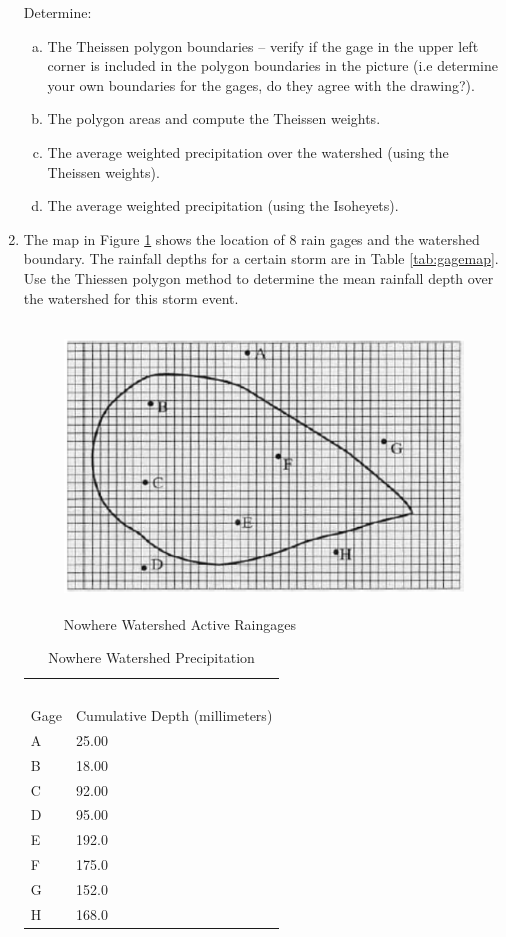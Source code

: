 \documentclass[12pt]{article}
\begin{document}
\begin{enumerate}
Determine:
    \begin{enumerate}[a)]
        \item The Theissen polygon boundaries – verify if the gage in the upper left corner is included in the polygon boundaries in the picture (i.e determine your own boundaries for the gages, do they agree with the drawing?). 
        \item The polygon areas and compute the Theissen weights.
        \item The average weighted precipitation over the watershed (using the Theissen weights).
        \item The average weighted precipitation (using the Isoheyets).
    \end{enumerate}
\clearpage
\item The map in Figure \ref{fig:gagemap} shows the location of 8 rain gages and the watershed boundary. The rainfall depths for a certain storm are in Table \ref{tab:gagemap}. Use the Thiessen polygon method to determine the mean rainfall depth over the watershed for this storm event.

\begin{figure}[h!] %
   \centering
   \includegraphics[height=3in]{gagemap.png} 
   \caption{Nowhere Watershed Active Raingages}
   \label{fig:gagemap}
\end{figure}

\begin{table}[h!]
\centering
\caption{Nowhere Watershed Precipitation}
\begin{tabular}{p{2.0in}p{2.0in}} %
~&~\\
Gage & Cumulative Depth (millimeters)\\
\hline
\hline
A & 25.00 \\
B & 18.00 \\
C & 92.00 \\
D & 95.00 \\
E & 192.0 \\
F & 175.0 \\
G & 152.0 \\
H & 168.0 \\


\end{tabular}
\end{table}
\end{enumerate}
\end{document}
